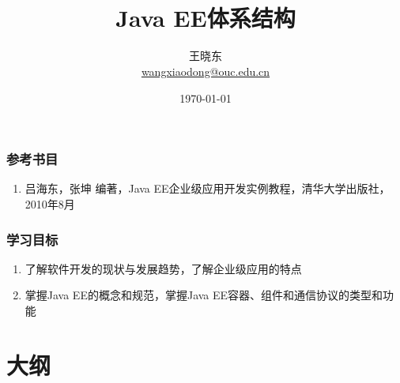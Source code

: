 
\title[KevinW@OUC]{\\  
 Java EE体系结构}
\author[王晓东]{王晓东\\
  \href{mailto:wangxiaodong@ouc.edu.cn}{\footnotesize wangxiaodong@ouc.edu.cn}}
\date{\today}



\frame{\titlepage}
\begin{frame}
\frametitle{参考书目}
\begin{enumerate}
\item 吕海东，张坤 编著，Java EE企业级应用开发实例教程，清华大学出版社，2010年8月
\end{enumerate}  
\end{frame}
\begin{frame}
  \frametitle{学习目标}

  \begin{enumerate}
  \item 了解软件开发的现状与发展趋势，了解企业级应用的特点
  \item 掌握Java EE的概念和规范，掌握Java EE容器、组件和通信协议的类型和功能
  \end{enumerate}  
\end{frame}
\section*{大纲}

